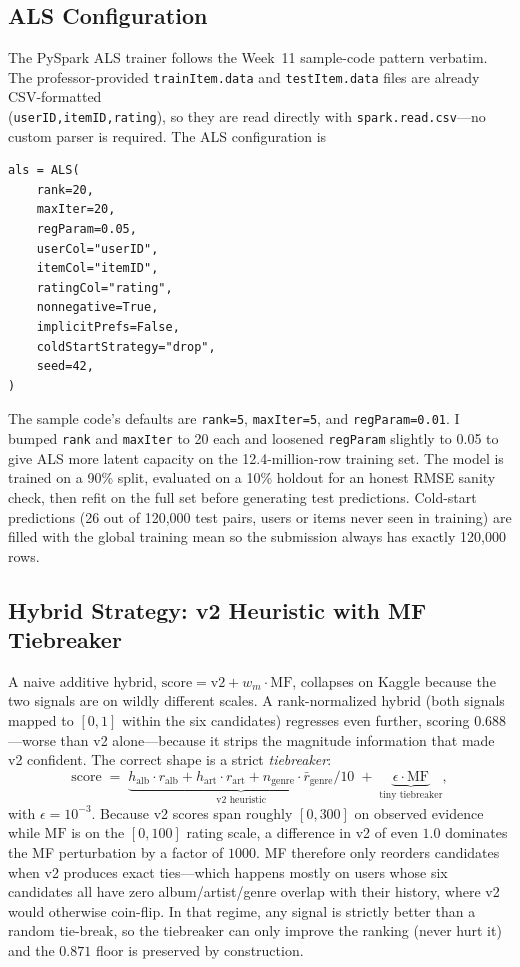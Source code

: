 \documentclass[12pt]{article}
\begin{document}
	\newpage
	\subsection{ALS Configuration}

	The PySpark ALS trainer follows the Week~11 sample-code pattern verbatim. The professor-provided \texttt{trainItem.data} and \texttt{testItem.data} files are already CSV-formatted \\ (\texttt{userID,itemID,rating}), so they are read directly with \texttt{spark.read.csv}---no custom parser is required. The ALS configuration is
	\begin{verbatim}
als = ALS(
    rank=20,
    maxIter=20,
    regParam=0.05,
    userCol="userID",
    itemCol="itemID",
    ratingCol="rating",
    nonnegative=True,
    implicitPrefs=False,
    coldStartStrategy="drop",
    seed=42,
)
	\end{verbatim}
	
	The sample code's defaults are \texttt{rank=5}, \texttt{maxIter=5}, and \texttt{regParam=0.01}. I bumped \texttt{rank} and \texttt{maxIter} to 20 each and loosened \texttt{regParam} slightly to 0.05 to give ALS more latent capacity on the 12.4-million-row training set. The model is trained on a 90\% split, evaluated on a 10\% holdout for an honest RMSE sanity check, then refit on the full set before generating test predictions. Cold-start predictions (26 out of 120{,}000 test pairs, users or items never seen in training) are filled with the global training mean so the submission always has exactly 120{,}000 rows.

	\newpage
	\subsection{Hybrid Strategy: v2 Heuristic with MF Tiebreaker}

	A naive additive hybrid, $\text{score} = \text{v2} + w_m\cdot\text{MF}$, collapses on Kaggle because the two signals are on wildly different scales. A rank-normalized hybrid (both signals mapped to $[0,1]$ within the six candidates) regresses even further, scoring $0.688$---worse than v2 alone---because it strips the magnitude information that made v2 confident. The correct shape is a strict \emph{tiebreaker}:
	\begin{equation}
		\text{score} \;=\; \underbrace{h_\text{alb}\cdot r_\text{alb} + h_\text{art}\cdot r_\text{art} + n_\text{genre}\cdot \bar{r}_\text{genre}/10}_{\text{v2 heuristic}} \;+\; \underbrace{\epsilon\cdot\text{MF}}_{\text{tiny tiebreaker}},
	\end{equation}
	with $\epsilon = 10^{-3}$. Because v2 scores span roughly $[0, 300]$ on observed evidence while $\text{MF}$ is on the $[0,100]$ rating scale, a difference in v2 of even $1.0$ dominates the MF perturbation by a factor of $1000$. MF therefore only reorders candidates when v2 produces exact ties---which happens mostly on users whose six candidates all have zero album/artist/genre overlap with their history, where v2 would otherwise coin-flip. In that regime, any signal is strictly better than a random tie-break, so the tiebreaker can only improve the ranking (never hurt it) and the $0.871$ floor is preserved by construction.
\end{document}
